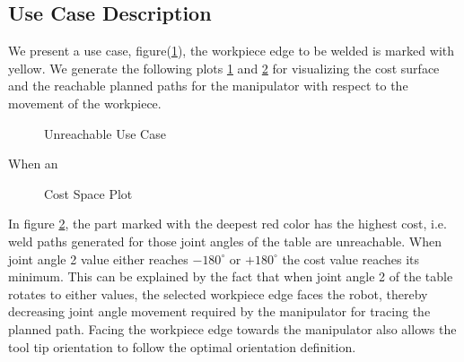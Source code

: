\subsection{Use Case Description}
\label{ssec:usc1}
We present a use case, figure(\ref{fig:rc1}), the  workpiece edge to be welded is marked with yellow. We generate the following plots \ref{fig:rc1} and \ref{fig:rc2} for visualizing the cost surface and the reachable planned paths for
 the manipulator with respect to the movement of the workpiece.
\begin{figure}[!ht] %
	\centering
	\caption{Unreachable Use Case}
	\label{fig:rc1}
\end{figure} 
When an

\begin{figure}[!ht] %
	\centering
	\caption{Cost Space Plot}
	\label{fig:rc2}
\end{figure}

In figure \ref{fig:rc2}, the part marked with the deepest red color has the highest cost, i.e. weld paths generated for those joint angles of the table are unreachable. When joint angle 2 value either reaches $-180^{\circ}$ or $+180^{\circ}$ the cost value reaches its minimum. This can be explained by the fact that when joint angle 2 of the table rotates to either values, the selected workpiece edge faces the robot, thereby decreasing joint angle movement required by the manipulator for tracing the planned path. Facing the workpiece edge towards the manipulator also allows the tool tip orientation to follow the optimal orientation definition. 

